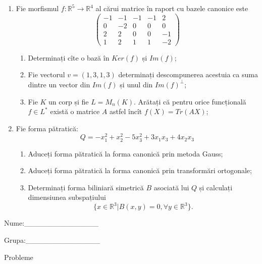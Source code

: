 \documentclass{article}
\begin{document}
\begin{enumerate}
 \item Fie morfismul $f:\mathbb{R}^5 \to \mathbb{R}^4$ al cărui matrice în raport cu bazele canonice este
$$\begin{pmatrix}
-1&-1&-1&-1&2\\
0&-2&0&0&0\\
2&2&0&0&-1\\
1&2&1&1&-2
\end{pmatrix}$$

\begin{enumerate}
\item Determinați cîte o bază în $Ker(f)$ și $Im(f)$;
\item Fie vectorul $v=(1,3,1,3)$ determinați descompunerea acestuia ca suma dintre un vector din $Im(f)$ și unul din $Im(f)^\perp$;
\item Fie $K$ un corp și fie $L=M_n(K)$. Arătați că pentru orice funcțională $f \in L^*$ există o matrice $A$ astfel încît $f(X)=Tr(AX)$;
\end{enumerate}
\item Fie forma pătratică:
$$Q= -x_1^2+x_2^2-5x_3^2+3x_1x_3+4x_2x_3$$

\begin{enumerate}
\item Aduceți forma pătratică la forma canonică prin metoda Gauss;
\item Aduceți forma pătratică la forma canonică prin transformări ortogonale;
\item Determinați forma biliniară simetrică $B$ asociată lui $Q$ și calculați dimensiunea subspațiului
$$\{x \in \mathbb{R}^3 | B(x,y)=0,\forall y \in \mathbb{R}^3\}.$$

\end{enumerate}
\end{enumerate}
\newpage
\begin{flushright}
Nume:\_\_\_\_\_\_\_\_\_\_\_\_\_\_
 
 
Grupa:\_\_\_\_\_\_\_\_\_\_\_\_\_\_
\end{flushright}
\begin{center}
\vspace{2cm}
{\Large Probleme}
\vspace{2cm}
\end{center}
\end{document}
